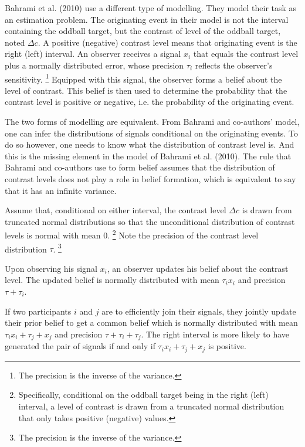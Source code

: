 \documentclass[12pt]{report}
\begin{document}
Bahrami et al. (2010) use a different type of modelling. They model their task as an estimation problem. The originating event in their model is not the interval containing the oddball target, but the contrast of level of the oddball target, noted $\Delta c$. A positive (negative) contrast level means that originating event is the right (left) interval. An observer receives a signal $x_i$ that equals the contrast level plus a normally distributed error, whose precision $\tau_i$ reflects the observer's sensitivity. \footnote{The precision is the inverse of the variance.} Equipped with this signal, the observer forms a belief about the level of contrast. This belief is then used to determine the probability that the contrast level is positive or negative, i.e. the probability of the originating event. 

The two forms of modelling are equivalent. From Bahrami and co-authors' model, one can infer the distributions of signals conditional on the originating events. To do so however, one needs to know what the distribution of contrast level is. And this is the missing element in the model of Bahrami et al. (2010). The rule that Bahrami and co-authors use to form belief assumes that the distribution of contrast levels does not play a role in belief formation, which is equivalent to say that it has an infinite variance. 

Assume that, conditional on either interval, the contrast level $\Delta c$ is drawn from truncated normal distributions so that the unconditional distribution of contrast levels is normal with mean 0. \footnote{Specifically, conditional on the oddball target being in the right (left) interval, a level of contrast is drawn from a truncated normal distribution that only takes positive (negative) values. } Note the precision of the contrast level distribution $\tau$. \footnote{The precision is the inverse of the variance.} 

Upon observing his signal $x_i$, an observer updates his belief about the contrast level. The updated belief is normally distributed with mean $\tau_i x_i$ and precision $\tau + \tau_i$. 

If two participants $i$ and $j$ are to efficiently join their signals, they jointly update their prior belief to get a common belief which is normally distributed with mean $\tau_i x_i + \tau_j + x_j$ and precision $\tau + \tau_i + \tau_j$. The right interval is more likely to have generated the pair of signals if and only if $\tau_i x_i + \tau_j + x_j$ is positive. 
\end{document}
